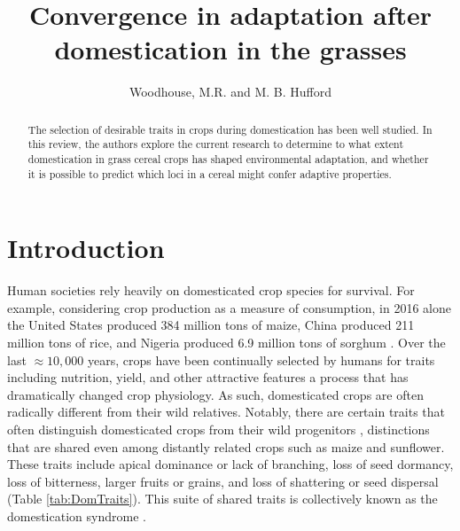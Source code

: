 \documentclass[12pt]{article}
\title{Convergence in adaptation after domestication in the grasses}
\author{Woodhouse, M.R. and M. B. Hufford}
\begin{document}
\maketitle

\begin{abstract}
The selection of desirable traits in crops during domestication has been well studied. In this review, the authors explore the current research to determine to what extent domestication in grass cereal crops has shaped environmental adaptation, and whether it is possible to predict which loci in a cereal might confer adaptive properties.
\end{abstract}

\section*{Introduction}
Human societies rely heavily on domesticated crop species for survival.
For example, considering crop production as a measure of consumption, in 2016 alone the United States produced 384 million tons of maize, China produced 211 million tons of rice, and Nigeria produced 6.9 million tons of sorghum \citep{FAOSTAT2018}.
Over the last $\approx10,000$ years, crops have been continually selected by humans for traits including nutrition, yield, and other attractive features a process that has dramatically changed crop physiology.
As such, domesticated crops are often radically different from their wild relatives.
Notably, there are certain traits that often distinguish domesticated crops from their wild progenitors \citep{Doebley2006}, distinctions that are shared even among distantly related crops such as maize and sunflower.
These traits include apical dominance or lack of branching, loss of seed dormancy, loss of bitterness, larger fruits or grains, and loss of shattering or seed dispersal (Table \ref{tab:DomTraits}).
This suite of shared traits is collectively known as the domestication syndrome \citep{Hammer1984}.
\end{document}
